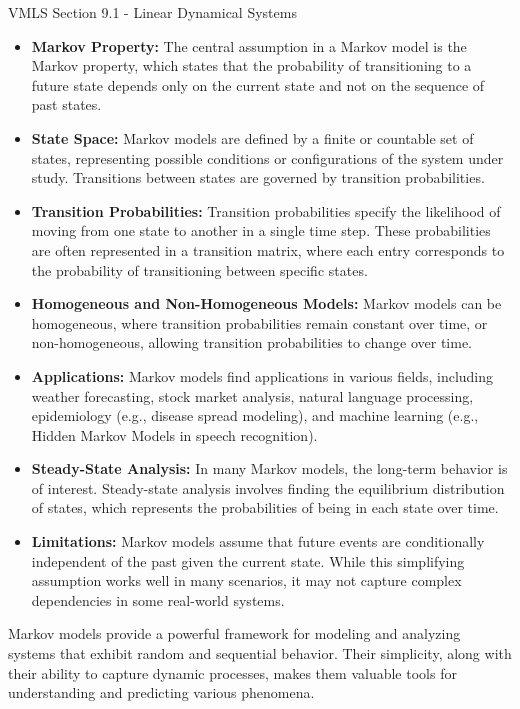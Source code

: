 \begin{notes}{VMLS Section 9.1 - Linear Dynamical Systems}
    \begin{itemize}
        \item \textbf{Markov Property:} The central assumption in a Markov model is the Markov property, which states that the probability of transitioning to a future state depends only on the current 
        state and not on the sequence of past states.
        \item \textbf{State Space:} Markov models are defined by a finite or countable set of states, representing possible conditions or configurations of the system under study. Transitions between 
        states are governed by transition probabilities.
        \item \textbf{Transition Probabilities:} Transition probabilities specify the likelihood of moving from one state to another in a single time step. These probabilities are often represented 
        in a transition matrix, where each entry corresponds to the probability of transitioning between specific states.
        \item \textbf{Homogeneous and Non-Homogeneous Models:} Markov models can be homogeneous, where transition probabilities remain constant over time, or non-homogeneous, allowing transition 
        probabilities to change over time.
        \item \textbf{Applications:} Markov models find applications in various fields, including weather forecasting, stock market analysis, natural language processing, epidemiology (e.g., disease 
        spread modeling), and machine learning (e.g., Hidden Markov Models in speech recognition).
        \item \textbf{Steady-State Analysis:} In many Markov models, the long-term behavior is of interest. Steady-state analysis involves finding the equilibrium distribution of states, which 
        represents the probabilities of being in each state over time.
        \item \textbf{Limitations:} Markov models assume that future events are conditionally independent of the past given the current state. While this simplifying assumption works well in many 
        scenarios, it may not capture complex dependencies in some real-world systems.
    \end{itemize}
    
    Markov models provide a powerful framework for modeling and analyzing systems that exhibit random and sequential behavior. Their simplicity, along with their ability to capture dynamic processes, 
    makes them valuable tools for understanding and predicting various phenomena.
\end{notes}


